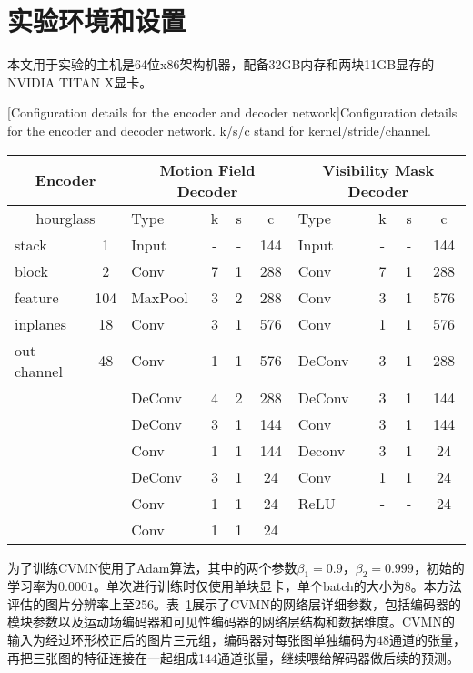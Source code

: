 \section{实验环境和设置}
本文用于实验的主机是64位x86架构机器，配备32GB内存和两块11GB显存的NVIDIA TITAN X显卡。
\begin{table}[!htbp] 
[Configuration details for the encoder and decoder network]{Configuration details for the encoder and decoder network. k/s/c stand for kernel/stride/channel.}
\label{tab:cvmn_arch}
\centering
\footnotesize%
\setlength{\tabcolsep}{4pt}%
\renewcommand{\arraystretch}{0.9}%
\begin{tabular}{l c l ccc  l ccc}
\hline
\multicolumn{2}{c}{Encoder} & \multicolumn{4}{c}{Motion Field Decoder} & \multicolumn{4}{c}{Visibility Mask Decoder} \\
\hline
\multicolumn{2}{c}{hourglass} & Type & k & s & c  & Type & k & s & c \\
\hline
stack       & 1   & Input  & - & - & 144 & Input   & - & - & 144 \\
block       & 2   & Conv   & 7 & 1 & 288 & Conv    & 7 & 1 & 288 \\
feature     & 104 & MaxPool& 3 & 2 & 288 & Conv    & 3 & 1 & 576 \\
inplanes    & 18  & Conv   & 3 & 1 & 576 & Conv    & 1 & 1 & 576 \\
out channel & 48  & Conv   & 1 & 1 & 576 & DeConv  & 3 & 1 & 288 \\
            &     & DeConv & 4 & 2 & 288 & DeConv  & 3 & 1 & 144 \\
            &     & DeConv & 3 & 1 & 144 & Conv    & 3 & 1 & 144 \\
            &     & Conv   & 1 & 1 & 144 & Deconv  & 3 & 1 & 24 \\
            &     & DeConv & 3 & 1 & 24 & Conv   & 1 & 1 & 24 \\
            &     & Conv   & 1 & 1 & 24 & ReLU    & - & - & 24 \\
            &     & Conv   & 1 & 1 & 24 &   &  &  &  \\
\hline
\end{tabular}
\end{table}
为了训练CVMN使用了Adam算法，其中的两个参数$\beta_1=0.9$，$\beta_2=0.999$，初始的学习率为$0.0001$。单次进行训练时仅使用单块显卡，单个batch的大小为8。本方法评估的图片分辨率上至256。表~\ref{tab:cvmn_arch}展示了CVMN的网络层详细参数，包括编码器的模块参数以及运动场编码器和可见性编码器的网络层结构和数据维度。CVMN的输入为经过环形校正后的图片三元组，编码器对每张图单独编码为48通道的张量，再把三张图的特征连接在一起组成144通道张量，继续喂给解码器做后续的预测。

